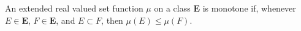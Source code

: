 An extended real valued set function $\mu$ on a class $\mathbf{E}$ is monotone if, whenever $E \in \mathbf{E}$, $F \in \mathbf{E}$, and $E \subset F$, then $\mu(E) \leq \mu(F)$.
